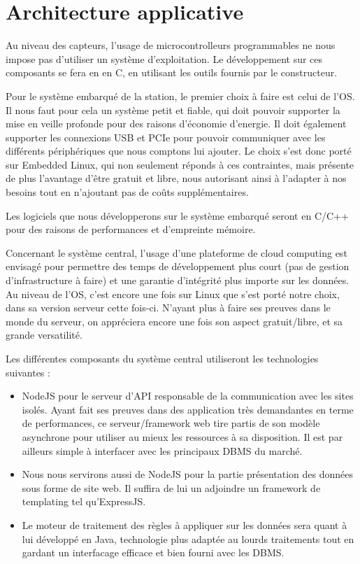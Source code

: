 \section{Architecture applicative}

Au niveau des capteurs, l'usage de microcontrolleurs programmables ne nous impose pas d'utiliser un système d'exploitation. Le développement sur ces composants se fera en en C, en utilisant les outils fournis par le constructeur.

Pour le système embarqué de la station, le premier choix à faire est celui de l'OS. Il nous faut pour cela un système petit et fiable, qui doit pouvoir supporter la mise en veille profonde pour des raisons d'économie d'energie. Il doit également supporter les connexions USB et PCIe pour pouvoir communiquer avec les différents périphériques que nous comptons lui ajouter. Le choix s'est donc porté sur Embedded Linux, qui non seulement réponds à ces contraintes, mais présente de plus l'avantage d'être gratuit et libre, nous autorisant ainsi à l'adapter à nos besoins tout en n'ajoutant pas de coûts supplémentaires.

Les logiciels que nous développerons sur le système embarqué seront en C/C++ pour des raisons de performances et d'empreinte mémoire.

Concernant le système central, l'usage d'une plateforme de cloud computing est envisagé pour permettre des temps de développement plus court (pas de gestion d'infrastructure à faire) et une garantie d'intégrité plus importe sur les données. Au niveau de l'OS, c'est encore une fois sur Linux que s'est porté notre choix, dans sa version serveur cette fois-ci. N'ayant plus à faire ses preuves dans le monde du serveur, on appréciera encore une fois son aspect gratuit/libre, et sa grande versatilité.

Les différentes composants du système central utiliseront les technologies suivantes :

\begin{itemize}
\item NodeJS pour le serveur d'API responsable de la communication avec les sites isolés. Ayant fait ses preuves dans des application très demandantes en terme de performances, ce serveur/framework web tire partis de son modèle asynchrone pour utiliser au mieux les ressources à sa disposition. Il est par ailleurs simple à interfacer avec les principaux DBMS du marché.
\item Nous nous servirons aussi de NodeJS pour la partie présentation des données sous forme de site web. Il suffira de lui un adjoindre un framework de templating tel qu'ExpressJS.
\item Le moteur de traitement des règles à appliquer sur les données sera quant à lui développé en Java, technologie plus adaptée au lourds traitements tout en gardant un interfacage efficace et bien fourni avec les DBMS.
\end{itemize}

